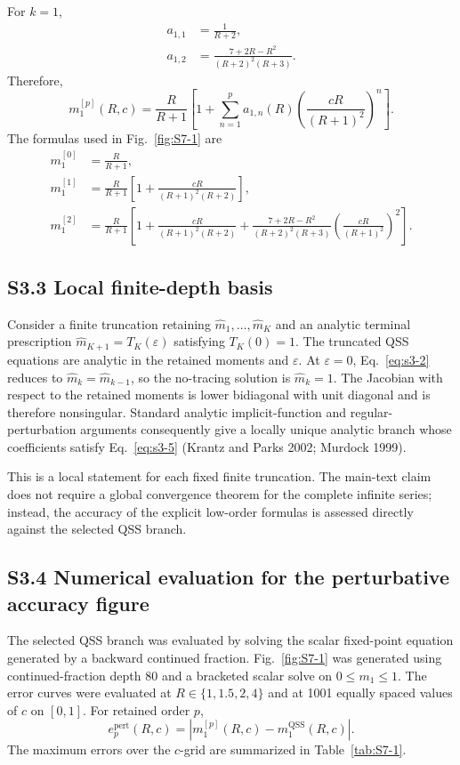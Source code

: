 \documentclass[11pt]{article}
\begin{document}
For $k=1$,
\begin{align}
a_{1,1}&=\frac{1}{R+2},\\
a_{1,2}&=\frac{7+2R-R^2}{(R+2)^2(R+3)}.
\end{align}
Therefore,
\begin{equation}
m_1^{[p]}(R,c)=\frac{R}{R+1}\left[1+\sum_{n=1}^{p}a_{1,n}(R)\left(\frac{cR}{(R+1)^2}\right)^n\right].
\end{equation}
The formulas used in Fig.~\ref{fig:S7-1} are
\begin{align}
m_1^{[0]}&=\frac{R}{R+1},\\
m_1^{[1]}&=\frac{R}{R+1}\left[1+\frac{cR}{(R+1)^2(R+2)}\right],\\
m_1^{[2]}&=\frac{R}{R+1}\left[1+\frac{cR}{(R+1)^2(R+2)}+\frac{7+2R-R^2}{(R+2)^2(R+3)}\left(\frac{cR}{(R+1)^2}\right)^2\right].
\end{align}

\subsection*{S3.3 Local finite-depth basis}

Consider a finite truncation retaining $\widehat m_1,\ldots,\widehat m_K$ and an analytic terminal prescription $\widehat m_{K+1}=T_K(\varepsilon)$ satisfying $T_K(0)=1$. The truncated QSS equations are analytic in the retained moments and $\varepsilon$. At $\varepsilon=0$, Eq.~\eqref{eq:s3-2} reduces to $\widehat m_k=\widehat m_{k-1}$, so the no-tracing solution is $\widehat m_k=1$. The Jacobian with respect to the retained moments is lower bidiagonal with unit diagonal and is therefore nonsingular. Standard analytic implicit-function and regular-perturbation arguments consequently give a locally unique analytic branch whose coefficients satisfy Eq.~\eqref{eq:s3-5} (Krantz and Parks 2002; Murdock 1999).

This is a local statement for each fixed finite truncation. The main-text claim does not require a global convergence theorem for the complete infinite series; instead, the accuracy of the explicit low-order formulas is assessed directly against the selected QSS branch.

\subsection*{S3.4 Numerical evaluation for the perturbative accuracy figure}

The selected QSS branch was evaluated by solving the scalar fixed-point equation generated by a backward continued fraction. Fig.~\ref{fig:S7-1} was generated using continued-fraction depth 80 and a bracketed scalar solve on $0\leq m_1\leq1$. The error curves were evaluated at $R\in\{1,1.5,2,4\}$ and at 1001 equally spaced values of $c$ on $[0,1]$. For retained order $p$,
\begin{equation}
e_p^{\mathrm{pert}}(R,c)=\left|m_1^{[p]}(R,c)-m_1^{\mathrm{QSS}}(R,c)\right|.
\end{equation}
The maximum errors over the $c$-grid are summarized in Table~\ref{tab:S7-1}.
\end{document}
